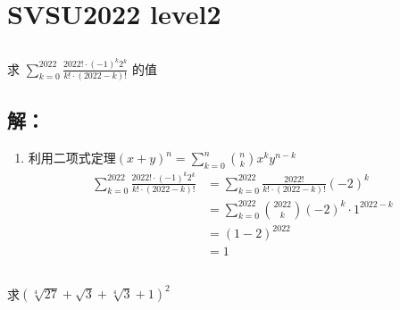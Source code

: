 \section{SVSU2022 level2}
\subsection{}
求
$\displaystyle\sum_{k=0}^{2022}\frac{2022!\cdot (-1)^k2^k}{k! \cdot (2022-k)!}$
的值

\subsection*{解：}
\begin{enumerate}
	\item 利用二项式定理$\displaystyle(x+y)^n = \sum_{k=0}^{n}\binom{n}{k}x^ky^{n-k}$
	      \begin{align}
		      \sum_{k=0}^{2022}\frac{2022!\cdot(-1)^k2^k}{k!\cdot(2022-k)!} & = \sum_{k=0}^{2022}\frac{2022!}{k!\cdot
		      (2022-k)!}(-2)^k                                                                                        \\
		                                                                    & =
		      \sum_{k=0}^{2022}\binom{2022}{k}(-2)^k\cdot 1^{2022-k}                                                  \\
		                                                                    & = (1-2)^{2022}                          \\
		                                                                    & = 1
	      \end{align}
\end{enumerate}

\subsection{}
求$(\sqrt[4]{27} + \sqrt{3} + \sqrt[4]{3} + 1)^2$
